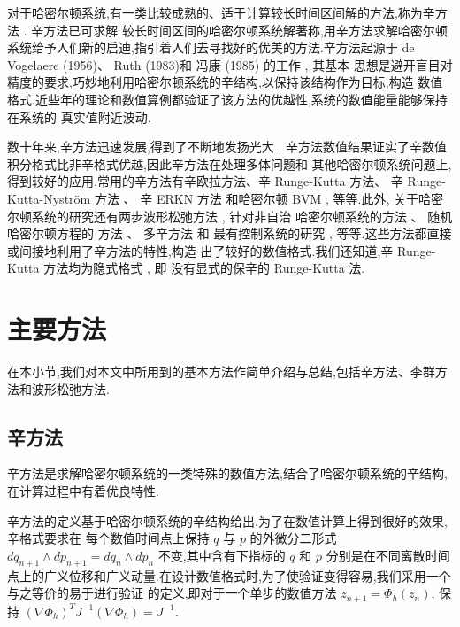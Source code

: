 对于哈密尔顿系统,有一类比较成熟的、适于计算较长时间区间解的方法,称为辛方法 \cite{feng2010symplectic}. 辛方法已可求解
较长时间区间的哈密尔顿系统解著称,用辛方法求解哈密尔顿系统给予人们新的启迪,指引着人们去寻找好的优美的方法.辛方法起源于
de Vogelaere (1956)、 Ruth (1983)和 冯康 (1985) 的工作 \cite{hairer2006geometric}, 其基本
思想是避开盲目对精度的要求,巧妙地利用哈密尔顿系统的辛结构,以保持该结构作为目标,构造
数值格式.近些年的理论和数值算例都验证了该方法的优越性,系统的数值能量能够保持在系统的
真实值附近波动.

数十年来,辛方法迅速发展,得到了不断地发扬光大 \cite{calvo1994numerical,leimkuhler2004simulating,hong2006multi,yang2009extended,monovasilis2013exponentially,xin2016birkhoffian,michalas2016numerical,liao2016multi}. 辛方法数值结果证实了辛数值积分格式比非辛格式优越,因此辛方法在处理多体问题和
其他哈密尔顿系统问题上,得到较好的应用.常用的辛方法有辛欧拉方法、辛 Runge-Kutta 方法、
辛 Runge-Kutta-Nystr{\"o}m 方法 \cite{kalogiratou2014fourth,kalogiratou2015}、 辛 ERKN
方法 \cite{wang2014ahigh} 和哈密尔顿 BVM \cite{brugnano2014multi}, 等等.此外,
关于哈密尔顿系统的研究还有两步波形松弛方法 \cite{hassanzadeh2014two}, 针对非自治
哈密尔顿系统的方法 \cite{hong2000numerical,zhang2010anote}、 随机哈密尔顿方程的
方法 \cite{burrage2014structure,ma2015sto,fan2015using}、 多辛方法 \cite{wang2013multi} 和
最有控制系统的研究 \cite{li2015asym}, 等等.这些方法都直接或间接地利用了辛方法的特性,构造
出了较好的数值格式.我们还知道,辛 Runge-Kutta 方法均为隐式格式 \cite{sanz1988runge}, 即
没有显式的保辛的 Runge-Kutta 法.

\section{主要方法}
在本小节,我们对本文中所用到的基本方法作简单介绍与总结,包括辛方法、李群方法和波形松弛方法.

\subsection{辛方法}

辛方法是求解哈密尔顿系统的一类特殊的数值方法,结合了哈密尔顿系统的辛结构,在计算过程中有着优良特性.

辛方法的定义基于哈密尔顿系统的辛结构给出.为了在数值计算上得到很好的效果,辛格式要求在
每个数值时间点上保持 $q$ 与 $p$ 的外微分二形式 $dq_{n+1}\wedge dp_{n+1}=dq_n\wedge dp_n$ 不变,其中含有下指标的 $q$ 和 $p$
分别是在不同离散时间点上的广义位移和广义动量.在设计数值格式时,为了使验证变得容易,我们采用一个与之等价的易于进行验证
的定义,即对于一个单步的数值方法 $z_{n+1}=\Phi_h(z_n)$, 保持 $(\nabla\Phi_h)^TJ^{-1}(\nabla\Phi_h)=J^{-1}$.

